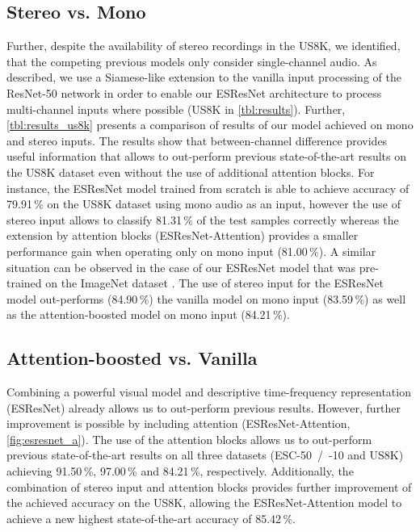 \documentclass[a4paper,conference]{IEEEtran}
\begin{document}
\subsection{Stereo vs. Mono} \label{ssec:stereo_vs_mono}
Further, despite the availability of stereo recordings in the US8K, we identified, that the competing previous models only consider single-channel audio.
As described, we use a Siamese-like extension to the vanilla input processing of the \mbox{ResNet-50} network in order to enable our \mbox{ESResNet} architecture to process multi-channel inputs where possible (US8K in \autoref{tbl:results}).
Further,
\autoref{tbl:results_us8k} presents a comparison of results of our model achieved on mono and stereo inputs.
The results show that between-channel difference provides useful information that allows to out-perform previous \mbox{state-of-the-art} results on the \mbox{US8K} dataset even without the use of additional attention blocks.
For instance, the \mbox{ESResNet} model trained from scratch is able to achieve accuracy of 79.91\,\% on the \mbox{US8K} dataset using mono audio as an input, however the use of stereo input allows to classify 81.31\,\% of the test samples correctly whereas the extension by attention blocks (\mbox{ESResNet-Attention}) provides a smaller performance gain when operating only on mono input (81.00\,\%).
A similar situation can be observed in the case of our \mbox{ESResNet} model that was pre-trained on the ImageNet dataset \cite{deng2009imagenet}.
The use of stereo input for the \mbox{ESResNet} model out-performs (84.90\,\%) the vanilla model on mono input (83.59\,\%) as well as the attention-boosted model on mono input (84.21\,\%).

\subsection{Attention-boosted vs. Vanilla} \label{ssec:attention_vs_vanilla}
Combining a powerful visual model and descriptive time-frequency representation (ESResNet) already allows us to out-perform previous results.
However, further improvement is possible by including attention (\mbox{ESResNet-Attention}, \autoref{fig:esresnet_a}).
The use of the attention blocks allows us to out-perform previous \mbox{state-of-the-art} results on all three datasets (\mbox{ESC-50 / -10} and \mbox{US8K}) achieving 91.50\,\%, 97.00\,\% and 84.21\,\%, respectively.
Additionally, the combination of stereo input and attention blocks provides further improvement of the achieved accuracy on the \mbox{US8K}, allowing the  \mbox{ESResNet-Attention} model to achieve a new highest \mbox{state-of-the-art} accuracy of 85.42\,\%.
\end{document}
